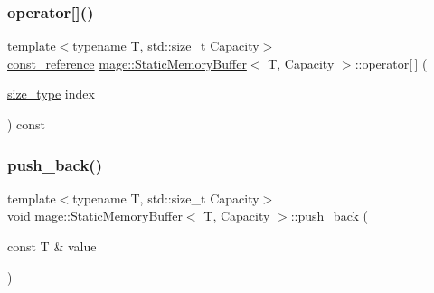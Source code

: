 \mbox{\label{classmage_1_1_static_memory_buffer_a5286b326f608cdfc5411346dcc75a2cd}} 
\subsubsection{\texorpdfstring{operator[]()}{operator[]()}\hspace{0.1cm}{\footnotesize\ttfamily [2/2]}}
{\footnotesize\ttfamily template$<$typename T, std\+::size\+\_\+t Capacity$>$ \\
\mbox{\hyperlink{classmage_1_1_static_memory_buffer_a2d961d7baf56ebc96e1e48579bcdcb84}{const\+\_\+reference}} \mbox{\hyperlink{classmage_1_1_static_memory_buffer}{mage\+::\+Static\+Memory\+Buffer}}$<$ T, Capacity $>$\+::operator\mbox{[}$\,$\mbox{]} (\begin{DoxyParamCaption}\item[{\mbox{\hyperlink{classmage_1_1_static_memory_buffer_a13e19b7af61a49400c5be360f09aadc8}{size\+\_\+type}}}]{index }\end{DoxyParamCaption}) const\hspace{0.3cm}{\ttfamily [noexcept]}}

\mbox{\label{classmage_1_1_static_memory_buffer_a5a9ef7074b08f165f84b0745422a91d2}} 
\subsubsection{\texorpdfstring{push\+\_\+back()}{push\_back()}\hspace{0.1cm}{\footnotesize\ttfamily [1/2]}}
{\footnotesize\ttfamily template$<$typename T, std\+::size\+\_\+t Capacity$>$ \\
void \mbox{\hyperlink{classmage_1_1_static_memory_buffer}{mage\+::\+Static\+Memory\+Buffer}}$<$ T, Capacity $>$\+::push\+\_\+back (\begin{DoxyParamCaption}\item[{const T \&}]{value }\end{DoxyParamCaption})}

